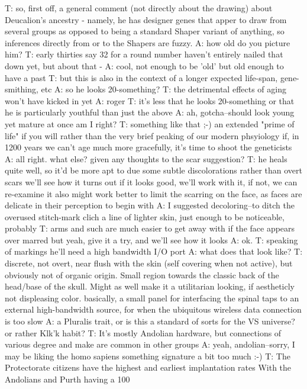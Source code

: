 T: so, first off, a general comment (not directly about the drawing) about Deucalion's ancestry - namely, he has designer genes that apper to draw from several groups as opposed to being a standard Shaper variant of anything, so inferences directly from or to the Shapers are fuzzy.
A: how old do you picture him?
T: early thirties
say 32 for a round number
haven't entirely nailed that down yet, but about that -
A: cool, not enough to be 'old' but old enough to have a past
T: but this is also in the context of a longer expected life-span, gene-smithing, etc
A: so he looks 20-something?
T: the detrimental effects of aging won't have kicked in yet
A: roger
T: it's less that he looks 20-something or that he is particularly youthful than just the above 
A: ah, gotcha--should look young yet mature
at once
am I right?
T: something like that ;-)
an extended "prime of life" if you will
rather than the very brief peaking of our modern phsyiology
if, in 1200 years we can't age much more gracefully, it's time to shoot the geneticists
A: all right. what else? given any thoughts to the scar suggestion?
T: he heals quite well, so it'd be more apt to due some subtle discolorations rather than overt scars
we'll see how it turns out
if it looks good, we'll work with it, if not, we can re-examine it
also might work better to limit the scarring on the face, as faces are delicate in their perception to begin with
A: I suggested decoloring--to ditch the overused stitch-mark clich
a line of lighter skin, just enough to be noticeable, probably
T: arms and such are much easier to get away with if the face appears over marred
but yeah, give it a try, and we'll see how it looks
A: ok.
T: speaking of markings
he'll need a high bandwidth I/O port
A: what does that look like?
T: discrete, not overt, near flush with the skin (self covering when not active), but obviously not of organic origin. Small region towards the classic back of the head/base of the skull. Might as well make it a utilitarian looking, if aestheticly not displeasing color.
basically, a small panel for interfacing the spinal taps to an external high-bandwidth source, for when the ubiquitous wireless data connection is too slow
A: a Pluralis trait, or is this a standard of sorts for the VS universe?
or rather Klk'k habit?
T: It's mostly Andolian hardware, but connections of various degree and make are common in other groups
A: yeah, andolian--sorry, I may be liking the homo sapiens something signature a bit too much :-)
T: The Protectorate citizens have the highest and earliest implantation rates
With the Andolians and Purth having a 100%
